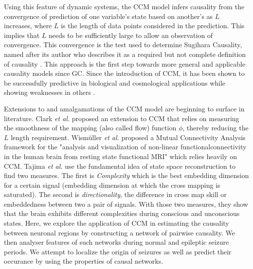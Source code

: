 Using this feature of dynamic systems, the CCM model infers causality from the convergence of prediction of one variable's state based on another's as $L$ increases, where $L$ is the length of data points considered in the prediction. This implies that $L$ needs to be sufficiently large to allow an observation of convergence. This convergence is the test used to determine Sugihara Causality, named after its author who describes it as a required but not complete definition of causality \cite{Sugihara2012}. This approach is the first step towards more general and applicable causality models since GC. Since the introduction of CCM, it has been shown to be successfully predictive in biological \cite{Deyle16042013,Wang2014,Sugihara2012,Mcbride2015,Nes2015} and cosmological \cite{Tsonis2015} applications while showing weaknesses in others \cite{Mccracken2014}. 

Extensions to and amalgamations of the CCM model are beginning to surface in literature. Clark \textit{et al.} proposed an extension to CCM that relies on measuring the smoothness of the mapping (also called flow) function $\phi$, thereby reducing the $L$ length requirement\cite{Clark2015}.  Wismüller \textit{et al.} proposed a Mutual Connectivity Analysis framework for the "analysis and visualization of non-linear functionalconnectivity in the human brain from resting state functional MRI" \cite{wismuller2014} which relies heavily on CCM. Tajima \textit{\textit{et al.}} use the fundamental idea of state space reconstruction to find two measures. The first is \textit{Complexity} which is the best embedding dimension for a certain signal (embedding dimension at which the cross mapping is saturated). The second is \textit{directionality}, the difference in cross map skill or embeddedness between two a pair of signals. With those two measures, they show that the brain exhibits different complexities during conscious and unconscious states. Here, we explore the application of CCM in estimating the causality between neuronal regions by constructing a network of pairwise causality. We then analyser features of such networks during normal and epileptic seizure periods. We attempt to localize the origin of seizures as well as predict their occurance by using the properties of causal networks.

